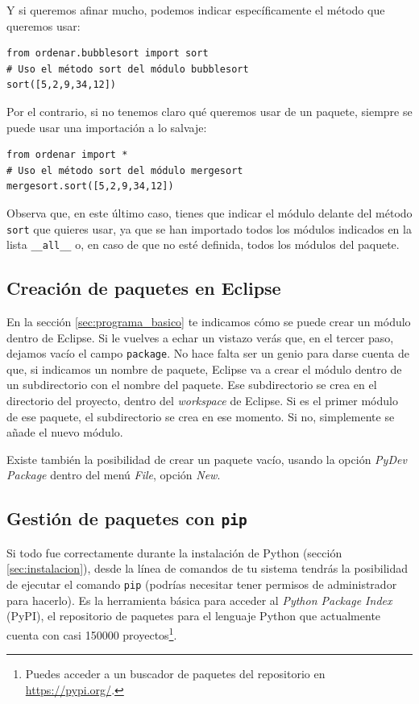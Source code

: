 {Y si queremos afinar mucho, podemos indicar específicamente el método que queremos usar:

\begin{lstlisting}
from ordenar.bubblesort import sort
# Uso el método sort del módulo bubblesort
sort([5,2,9,34,12])
\end{lstlisting}

Por el contrario, si no tenemos claro qué queremos usar de un paquete, siempre se puede usar una importación a lo salvaje:

\begin{lstlisting}
from ordenar import *
# Uso el método sort del módulo mergesort
mergesort.sort([5,2,9,34,12])
\end{lstlisting}

Observa que, en este último caso, tienes que indicar el módulo delante del método \texttt{sort}	que quieres usar, ya que se han importado todos los módulos indicados en la lista \texttt{\_\_all\_\_} o, en caso de que no esté definida, todos los módulos del paquete.


\subsection{Creación de paquetes en Eclipse}

En la sección \ref{sec:programa_basico} te indicamos cómo se puede crear un módulo dentro de Eclipse. Si le vuelves a echar un vistazo verás que, en el tercer paso, dejamos vacío el campo \texttt{package}. No hace falta ser un genio para darse cuenta de que, si indicamos un nombre de paquete, Eclipse va a crear el módulo dentro de un subdirectorio con el nombre del paquete. Ese subdirectorio se crea en el directorio del proyecto, dentro del \emph{workspace} de Eclipse. Si es el primer módulo de ese paquete, el subdirectorio se crea en ese momento. Si no, simplemente se añade el nuevo módulo.

Existe también la posibilidad de crear un paquete vacío, usando la opción \emph{PyDev Package} dentro del menú \emph{File}, opción \emph{New}.

\subsection{Gestión de paquetes con \texttt{pip}}

Si todo fue correctamente durante la instalación de Python (sección \ref{sec:instalacion}), desde la línea de comandos de tu sistema tendrás la posibilidad de ejecutar el comando \texttt{pip} (podrías necesitar tener permisos de administrador para hacerlo). Es la herramienta básica para acceder al \emph{Python Package Index} (PyPI), el repositorio de paquetes para el lenguaje Python que actualmente cuenta con casi 150000 proyectos\footnote{Puedes acceder a un buscador de paquetes del repositorio en \url{https://pypi.org/}.}.

}
